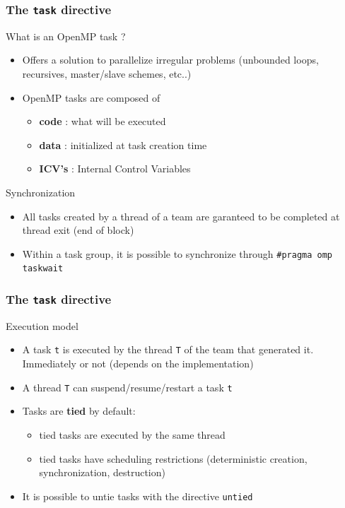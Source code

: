 \begin{frame}[containsverbatim]
\frametitle{The \texttt{task} directive}

\begin{exampleblock}{What is an OpenMP task ?}
\begin{itemize}
\item{Offers a solution to parallelize irregular problems (unbounded loops, recursives, master/slave schemes, etc..)}
\item{OpenMP tasks are composed of
        \begin{itemize}
        \item{\textbf{code} : what will be executed}
        \item{\textbf{data} : initialized at task creation time }
        \item{\textbf{ICV's} : Internal Control Variables }
        \end{itemize}
}
\end{itemize}
\end{exampleblock}

\begin{exampleblock}{Synchronization}
\begin{itemize}
\item{All tasks created by a thread of a team are garanteed to be completed at
    thread exit (end of block)}
\item{Within a task group, it is possible to synchronize through \texttt{\#pragma
      omp taskwait}}
\end{itemize}
\end{exampleblock}
\end{frame}



\begin{frame}[containsverbatim]
\frametitle{The \texttt{task} directive}

\begin{exampleblock}{Execution model}
\begin{itemize}
\item{A task \texttt{t} is executed by the thread \texttt{T} of the team that generated it. Immediately or not (depends on the implementation)}
\item{A thread \texttt{T} can suspend/resume/restart a task \texttt{t}}
\item{Tasks are \textbf{tied} by default:
        \begin{itemize}
        \item{tied tasks are executed by the same thread}
        \item{tied tasks have scheduling restrictions (deterministic creation, synchronization, destruction)}
        \end{itemize}
}
\item{It is possible to untie tasks with the directive \texttt{untied}}
\end{itemize}
\end{exampleblock}


\end{frame}



